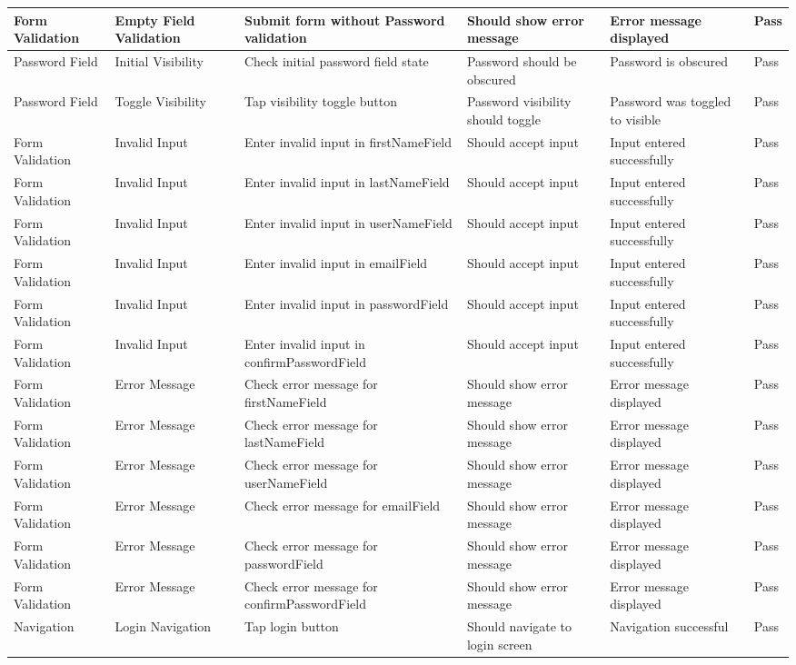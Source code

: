 \begin{table*}[t]
\begin{tabular}{|p{2.5cm}|p{2.5cm}|p{3cm}|p{3cm}|p{3cm}|p{1cm}|}
Form Validation & Empty Field Validation & Submit form without Password validation & Should show error message & Error message displayed & Pass \\ \hline
Password Field & Initial Visibility & Check initial password field state & Password should be obscured & Password is obscured & Pass \\ \hline
Password Field & Toggle Visibility & Tap visibility toggle button & Password visibility should toggle & Password was toggled to visible & Pass \\ \hline
Form Validation & Invalid Input & Enter invalid input in firstNameField & Should accept input & Input entered successfully & Pass \\ \hline
Form Validation & Invalid Input & Enter invalid input in lastNameField & Should accept input & Input entered successfully & Pass \\ \hline
Form Validation & Invalid Input & Enter invalid input in userNameField & Should accept input & Input entered successfully & Pass \\ \hline
Form Validation & Invalid Input & Enter invalid input in emailField & Should accept input & Input entered successfully & Pass \\ \hline
Form Validation & Invalid Input & Enter invalid input in passwordField & Should accept input & Input entered successfully & Pass \\ \hline
Form Validation & Invalid Input & Enter invalid input in confirmPasswordField & Should accept input & Input entered successfully & Pass \\ \hline
Form Validation & Error Message & Check error message for firstNameField & Should show error message & Error message displayed & Pass \\ \hline
Form Validation & Error Message & Check error message for lastNameField & Should show error message & Error message displayed & Pass \\ \hline
Form Validation & Error Message & Check error message for userNameField & Should show error message & Error message displayed & Pass \\ \hline
Form Validation & Error Message & Check error message for emailField & Should show error message & Error message displayed & Pass \\ \hline
Form Validation & Error Message & Check error message for passwordField & Should show error message & Error message displayed & Pass \\ \hline
Form Validation & Error Message & Check error message for confirmPasswordField & Should show error message & Error message displayed & Pass \\ \hline
Navigation & Login Navigation & Tap login button & Should navigate to login screen & Navigation successful & Pass \\ \hline
\end{tabular}
\end{table*}
